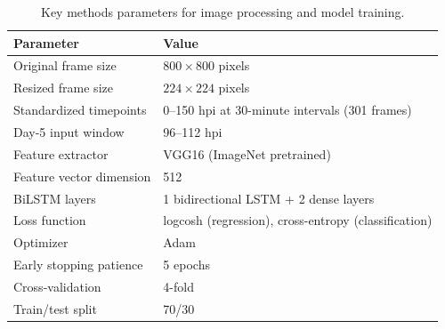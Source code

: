 \documentclass[12pt]{article}
\begin{document}
\begin{table}[H]
\centering
\caption{Key methods parameters for image processing and model training.}
\label{tab:methods_params}
\begin{tabular}{ll}
\toprule
\textbf{Parameter} & \textbf{Value} \\
\midrule
Original frame size & $800 \times 800$ pixels \\
Resized frame size & $224 \times 224$ pixels \\
Standardized timepoints & 0--150 hpi at 30-minute intervals (301 frames) \\
Day-5 input window & 96--112 hpi \\
Feature extractor & VGG16 (ImageNet pretrained) \\
Feature vector dimension & 512 \\
BiLSTM layers & 1 bidirectional LSTM + 2 dense layers \\
Loss function & logcosh (regression), cross-entropy (classification) \\
Optimizer & Adam \\
Early stopping patience & 5 epochs \\
Cross-validation & 4-fold \\
Train/test split & 70/30 \\
\bottomrule
\end{tabular}
\end{table}
\end{document}
